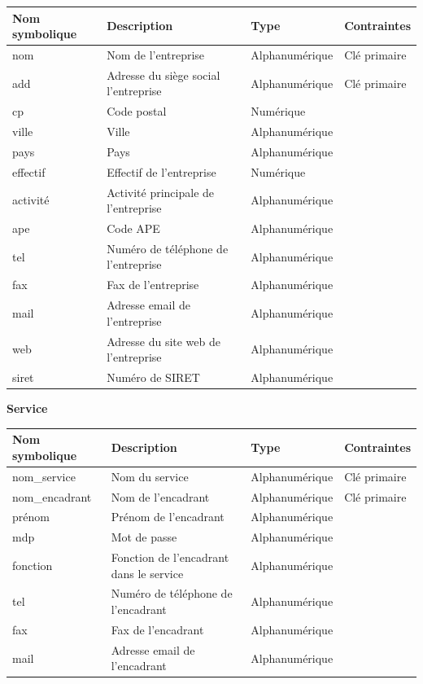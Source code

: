\documentclass{scrreprt}
\begin{document}
\begin{tabular}{|l|l|l|l|}
\hline
\textbf{Nom symbolique} & \textbf{Description} & \textbf{Type} & \textbf{Contraintes} \\
\hline
nom & Nom de l'entreprise & Alphanumérique & Clé primaire \\
add & Adresse du siège social l’entreprise & Alphanumérique & Clé primaire \\
cp & Code postal & Numérique & \\
ville & Ville & Alphanumérique & \\
pays & Pays & Alphanumérique & \\
effectif & Effectif de l'entreprise & Numérique & \\
activité & Activité principale de l'entreprise & Alphanumérique & \\
ape & Code APE & Alphanumérique & \\
tel &  Numéro de téléphone de l'entreprise & Alphanumérique & \\
fax & Fax de l'entreprise & Alphanumérique & \\
mail & Adresse email de l’entreprise & Alphanumérique & \\
web & Adresse du site web de l'entreprise & Alphanumérique & \\
siret & Numéro de SIRET & Alphanumérique & \\
\hline
\end{tabular}

\begin{flushleft}
\textbf{Service}
\end{flushleft}

\begin{tabular}{|l|l|l|l|}
\hline
\textbf{Nom symbolique} & \textbf{Description} & \textbf{Type} & \textbf{Contraintes} \\
\hline
nom\_service & Nom du service & Alphanumérique & Clé primaire \\
nom\_encadrant & Nom de l'encadrant & Alphanumérique & Clé primaire \\
prénom & Prénom de l'encadrant & Alphanumérique & \\
mdp & Mot de passe & Alphanumérique & \\
fonction & Fonction de l'encadrant dans le service & Alphanumérique & \\
tel & Numéro de téléphone de l'encadrant & Alphanumérique & \\
fax & Fax de l'encadrant & Alphanumérique & \\
mail & Adresse email de l'encadrant & Alphanumérique & \\
\hline
\end{tabular}
\end{document}
